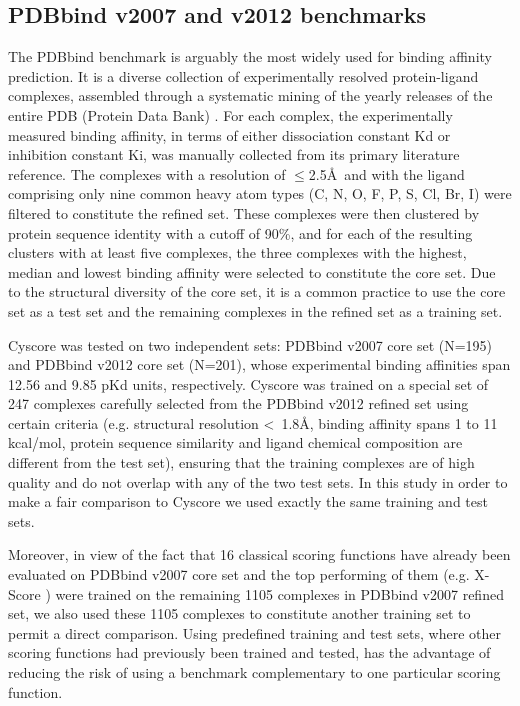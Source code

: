 \subsection{PDBbind v2007 and v2012 benchmarks}

The PDBbind \citep{529,530,1633} benchmark is arguably the most widely used for binding affinity prediction. It is a diverse collection of experimentally resolved protein-ligand complexes, assembled through a systematic mining of the yearly releases of the entire PDB (Protein Data Bank) \citep{540,537}. For each complex, the experimentally measured binding affinity, in terms of either dissociation constant Kd or inhibition constant Ki, was manually collected from its primary literature reference. The complexes with a resolution of $\le$2.5\AA\ and with the ligand comprising only nine common heavy atom types (C, N, O, F, P, S, Cl, Br, I) were filtered to constitute the refined set. These complexes were then clustered by protein sequence identity with a cutoff of 90\%, and for each of the resulting clusters with at least five complexes, the three complexes with the highest, median and lowest binding affinity were selected to constitute the core set. Due to the structural diversity of the core set, it is a common practice to use the core set as a test set and the remaining complexes in the refined set as a training set.

Cyscore was tested on two independent sets: PDBbind v2007 core set (N=195) and PDBbind v2012 core set (N=201), whose experimental binding affinities span 12.56 and 9.85 pKd units, respectively. Cyscore was trained on a special set of 247 complexes carefully selected from the PDBbind v2012 refined set using certain criteria \citep{1372} (e.g. structural resolution \textless\ 1.8\AA, binding affinity spans 1 to 11 kcal/mol, protein sequence similarity and ligand chemical composition are different from the test set), ensuring that the training complexes are of high quality and do not overlap with any of the two test sets. In this study in order to make a fair comparison to Cyscore we used exactly the same training and test sets.

Moreover, in view of the fact that 16 classical scoring functions have already been evaluated \citep{1313} on PDBbind v2007 core set and the top performing of them (e.g. X-Score \citep{573}) were trained on the remaining 1105 complexes in PDBbind v2007 refined set, we also used these 1105 complexes to constitute another training set to permit a direct comparison. Using predefined training and test sets, where other scoring functions had previously been trained and tested, has the advantage of reducing the risk of using a benchmark complementary to one particular scoring function.

